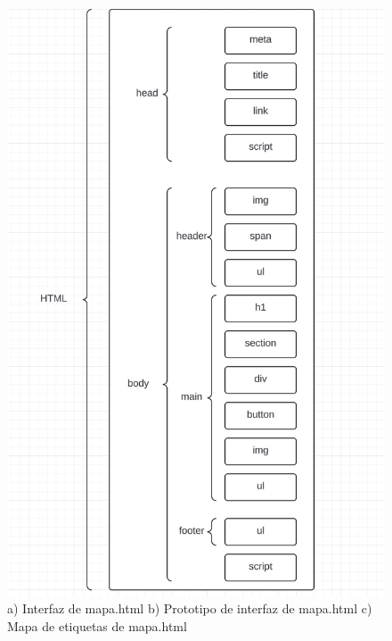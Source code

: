\documentclass{article}
\begin{document}
\begin{figure}[H]
\begin{minipage}{0.49\textwidth}
    \end{minipage}
    
    \vspace{5mm}
    
    \includegraphics[width=\textwidth, height=0.5\textheight, keepaspectratio]{htmlFotos/MEAH.jpg}
    \caption{a) Interfaz de mapa.html b) Prototipo de interfaz de mapa.html c) Mapa de etiquetas de mapa.html}
    \label{fig:imagenes_conjuntas}
\end{figure}
\end{document}
